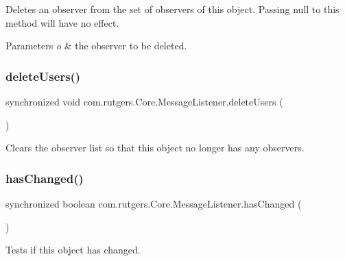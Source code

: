 Deletes an observer from the set of observers of this object. Passing {\ttfamily null} to this method will have no effect. 
\begin{DoxyParams}{Parameters}
{\em o} & the observer to be deleted. \\
\hline
\end{DoxyParams}
\mbox{\label{classcom_1_1rutgers_1_1Core_1_1MessageListener_abdf30a5ebb8f88e5a0083c9ea0ac48c2}} 
\subsubsection{\texorpdfstring{delete\+Users()}{deleteUsers()}}
{\footnotesize\ttfamily synchronized void com.\+rutgers.\+Core.\+Message\+Listener.\+delete\+Users (\begin{DoxyParamCaption}{ }\end{DoxyParamCaption})}

Clears the observer list so that this object no longer has any observers. \mbox{\label{classcom_1_1rutgers_1_1Core_1_1MessageListener_a00241c82f572dc5e692a888f450b78d9}} 
\subsubsection{\texorpdfstring{has\+Changed()}{hasChanged()}}
{\footnotesize\ttfamily synchronized boolean com.\+rutgers.\+Core.\+Message\+Listener.\+has\+Changed (\begin{DoxyParamCaption}{ }\end{DoxyParamCaption})}

Tests if this object has changed.

